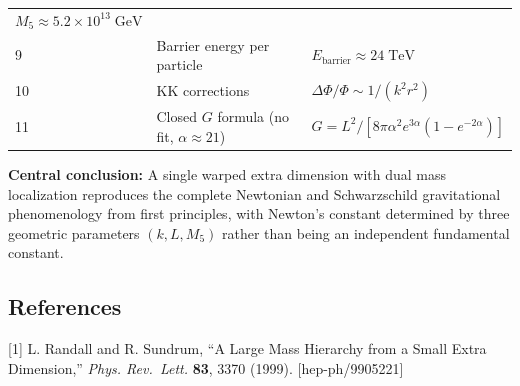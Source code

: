 \documentclass[
  11pt,
]{article}
\begin{document}
\begin{longtable}[]{@{}lll@{}}
\begin{minipage}[t]{0.43\columnwidth}
\(M_5 \approx 5.2 \times 10^{13}\;\text{GeV}\)\strut
\end{minipage}\tabularnewline
\begin{minipage}[t]{0.13\columnwidth}\raggedright
9\strut
\end{minipage} & \begin{minipage}[t]{0.35\columnwidth}\raggedright
Barrier energy per particle\strut
\end{minipage} & \begin{minipage}[t]{0.43\columnwidth}\raggedright
\(E_{\text{barrier}} \approx 24\;\text{TeV}\)\strut
\end{minipage}\tabularnewline
\begin{minipage}[t]{0.13\columnwidth}\raggedright
10\strut
\end{minipage} & \begin{minipage}[t]{0.35\columnwidth}\raggedright
KK corrections\strut
\end{minipage} & \begin{minipage}[t]{0.43\columnwidth}\raggedright
\(\Delta\Phi/\Phi \sim 1/(k^2 r^2)\)\strut
\end{minipage}\tabularnewline
\begin{minipage}[t]{0.13\columnwidth}\raggedright
11\strut
\end{minipage} & \begin{minipage}[t]{0.35\columnwidth}\raggedright
Closed \(G\) formula (no fit, \(\alpha \approx 21\))\strut
\end{minipage} & \begin{minipage}[t]{0.43\columnwidth}\raggedright
\(G = L^2/[8\pi\alpha^2 e^{3\alpha}(1-e^{-2\alpha})]\)\strut
\end{minipage}\tabularnewline
\bottomrule
\end{longtable}

\textbf{Central conclusion:} A single warped extra dimension with dual
mass localization reproduces the complete Newtonian and Schwarzschild
gravitational phenomenology from first principles, with Newton's
constant determined by three geometric parameters \((k, L, M_5)\) rather
than being an independent fundamental constant.

\bigskip

\hypertarget{references}{%
\subsection{References}\label{references}}

{[}1{]} L. Randall and R. Sundrum, ``A Large Mass Hierarchy from a Small
Extra Dimension,'' \emph{Phys. Rev.~Lett.} \textbf{83}, 3370 (1999).
{[}hep-ph/9905221{]}
\end{document}
